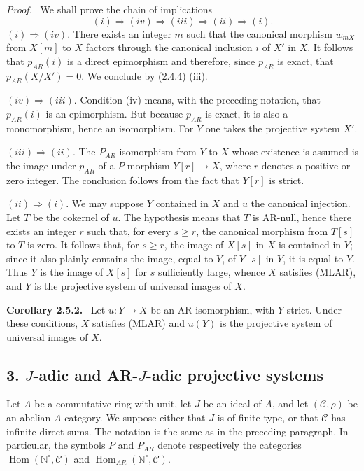 \documentclass[11pt]{article}
\providecommand{\NN}{\mathbb{N}}
\newenvironment{statement}[1]{\par\medskip\noindent\textbf{#1.}\ }{\par\medskip}
\newenvironment{prooftext}[1][Proof]{\par\noindent\emph{#1.}\ }{\par\medskip}
\DeclareMathOperator{\Hom}{Hom}
\providecommand{\Hom}{\operatorname{Hom}}
\providecommand{\NN}{\mathbb N}
\providecommand{\cC}{\mathcal C}
\begin{document}
\begin{prooftext}[Proof]
We shall prove the chain of implications
\[
(i)\Rightarrow(iv)\Rightarrow(iii)\Rightarrow(ii)\Rightarrow(i).
\]
$(i)\Rightarrow(iv)$. There exists an integer $m$ such that the canonical morphism $w_{mX}$ from $X[m]$ to $X$ factors through the canonical inclusion $i$ of $X'$ in $X$. It follows that $p_{AR}(i)$ is a direct epimorphism and therefore, since $p_{AR}$ is exact, that $p_{AR}(X/X')=0$. We conclude by (2.4.4) (iii).

$(iv)\Rightarrow(iii)$. Condition (iv) means, with the preceding notation, that $p_{AR}(i)$ is an epimorphism. But because $p_{AR}$ is exact, it is also a monomorphism, hence an isomorphism. For $Y$ one takes the projective system $X'$.

$(iii)\Rightarrow(ii)$. The $P_{AR}$-isomorphism from $Y$ to $X$ whose existence is assumed is the image under $p_{AR}$ of a $P$-morphism $Y[r]\to X$, where $r$ denotes a positive or zero integer. The conclusion follows from the fact that $Y[r]$ is strict.

$(ii)\Rightarrow(i)$. We may suppose $Y$ contained in $X$ and $u$ the canonical injection. Let $T$ be the cokernel of $u$. The hypothesis means that $T$ is AR-null, hence there exists an integer $r$ such that, for every $s\ge r$, the canonical morphism from $T[s]$ to $T$ is zero. It follows that, for $s\ge r$, the image of $X[s]$ in $X$ is contained in $Y$; since it also plainly contains the image, equal to $Y$, of $Y[s]$ in $Y$, it is equal to $Y$. Thus $Y$ is the image of $X[s]$ for $s$ sufficiently large, whence $X$ satisfies (MLAR), and $Y$ is the projective system of universal images of $X$.
\end{prooftext}

\begin{statement}{Corollary 2.5.2}
Let $u:Y\to X$ be an AR-isomorphism, with $Y$ strict. Under these conditions, $X$ satisfies (MLAR) and $u(Y)$ is the projective system of universal images of $X$.
\end{statement}

\subsection*{3. $J$-adic and AR-$J$-adic projective systems}
Let $A$ be a commutative ring with unit, let $J$ be an ideal of $A$, and let $(\cC,\rho)$ be an abelian $A$-category. We suppose either that $J$ is of finite type, or that $\cC$ has infinite direct sums. The notation is the same as in the preceding paragraph. In particular, the symbols $P$ and $P_{AR}$ denote respectively the categories $\Hom(\NN^\circ,\cC)$ and $\Hom_{AR}(\NN^\circ,\cC)$.
\end{document}
